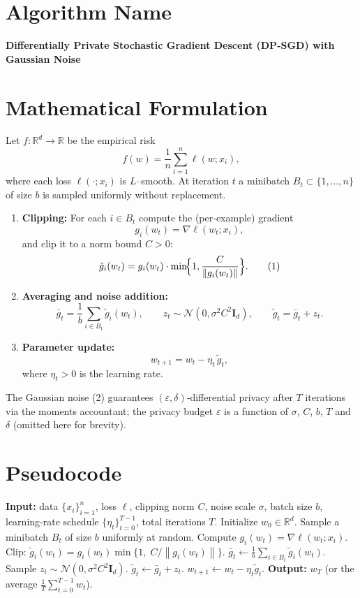 \documentclass{article}
\newcommand{\R}{\mathbb{R}}
\newcommand{\norm}[1]{\left\|#1\right\|}
\newcommand{\grad}{\nabla}
\newcommand{\sig}{\sigma}
\begin{document}
\section*{Algorithm Name}
\textbf{Differentially Private Stochastic Gradient Descent (DP‑SGD) with Gaussian Noise}

\section*{Mathematical Formulation}
Let $f:\R^{d}\rightarrow\R$ be the empirical risk 
\[
f(w)=\frac{1}{n}\sum_{i=1}^{n}\ell(w;x_{i}),
\]
where each loss $\ell(\cdot;x_i)$ is $L$–smooth.  
At iteration $t$ a minibatch $B_t\subset\{1,\dots,n\}$ of size $b$ is sampled uniformly without replacement.  

\begin{enumerate}
\item \textbf{Clipping:} For each $i\in B_t$ compute the (per‑example) gradient
\[
g_i(w_t)=\grad\ell(w_t;x_i),
\]
and clip it to a norm bound $C>0$:
\[
\tilde g_i(w_t)=g_i(w_t)\cdot 
\min\!\Bigl\{1,\frac{C}{\norm{g_i(w_t)}}\Bigr\}.
\tag{1}
\]

\item \textbf{Averaging and noise addition:}
\[
\bar g_t=\frac{1}{b}\sum_{i\in B_t}\tilde g_i(w_t),\qquad 
z_t\sim\mathcal N(0,\sig^2 C^{2}\mathbf I_{d}),\qquad 
\tilde g_t=\bar g_t+z_t.
\tag{2}
\]

\item \textbf{Parameter update:}
\[
w_{t+1}=w_t-\eta_t\,\tilde g_t,
\tag{3}
\]
where $\eta_t>0$ is the learning rate.
\end{enumerate}

The Gaussian noise (2) guarantees $(\varepsilon,\delta)$‑differential privacy after $T$ iterations via the moments accountant; the privacy budget $\varepsilon$ is a function of $\sig$, $C$, $b$, $T$ and $\delta$ (omitted here for brevity).

\section*{Pseudocode}
\begin{algorithm}[H]
\caption{DP‑SGD with Gaussian Noise}
\begin{algorithmic}[1]
\STATE \textbf{Input:} data $\{x_i\}_{i=1}^n$, loss $\ell$, clipping norm $C$, noise scale $\sig$, batch size $b$, learning‑rate schedule $\{\eta_t\}_{t=0}^{T-1}$, total iterations $T$.
\STATE Initialize $w_0\in\R^d$.
    \STATE Sample a minibatch $B_t$ of size $b$ uniformly at random.
        \STATE Compute $g_i(w_t)=\grad\ell(w_t;x_i)$.
        \STATE Clip: $\tilde g_i(w_t)=g_i(w_t)\min\{1,\;C/\norm{g_i(w_t)}\}$.
    \ENDFOR
    \STATE $\bar g_t\gets \frac{1}{b}\sum_{i\in B_t}\tilde g_i(w_t)$.
    \STATE Sample $z_t\sim\mathcal N(0,\sig^2 C^{2}\mathbf I_d)$.
    \STATE $\tilde g_t\gets \bar g_t+z_t$.
    \STATE $w_{t+1}\gets w_t-\eta_t\tilde g_t$.
\ENDFOR
\STATE \textbf{Output:} $w_T$ (or the average $\frac1T\sum_{t=0}^{T-1}w_t$).
\end{algorithmic}
\end{algorithm}
\end{document}
